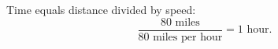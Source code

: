 Time equals distance divided by speed:
\[
\dfrac{80\text{ miles}}{80\text{ miles per hour}}=\boxed{1\text{ hour}}.
\]
